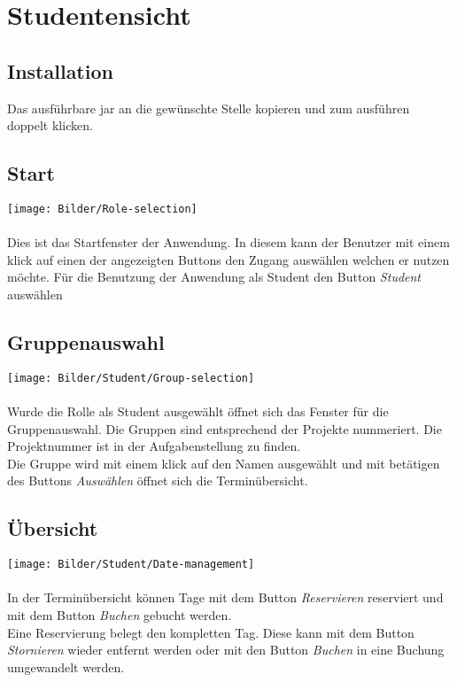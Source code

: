 \section{Studentensicht}

\subsection{Installation}
Das ausführbare jar an die gewünschte Stelle kopieren und zum ausführen doppelt klicken.

\subsection{Start}
\texttt{[image: Bilder/Role-selection]}
\\
\\
Dies ist das Startfenster der Anwendung. In diesem kann der Benutzer mit einem klick auf einen der angezeigten Buttons den Zugang auswählen welchen er nutzen möchte. Für die Benutzung der Anwendung als Student den Button \textit{Student} auswählen


\subsection{Gruppenauswahl}
\texttt{[image: Bilder/Student/Group-selection]}
\\
\\
Wurde die Rolle als Student ausgewählt öffnet sich das Fenster für die Gruppenauswahl. Die Gruppen sind entsprechend der Projekte nummeriert. Die Projektnummer ist in der Aufgabenstellung zu finden. 
\\
Die Gruppe wird mit einem klick auf den Namen ausgewählt und mit betätigen des Buttons \textit{Auswählen} öffnet sich die Terminübersicht.

\subsection{Übersicht}
\texttt{[image: Bilder/Student/Date-management]}
\\
\\
In der Terminübersicht können Tage mit dem Button \textit{Reservieren} reserviert und mit dem Button \textit{Buchen} gebucht werden. 
\\
Eine Reservierung belegt den kompletten Tag. Diese kann mit dem Button \textit{Stornieren} wieder entfernt werden oder mit den Button \textit{Buchen} in eine Buchung umgewandelt werden.

